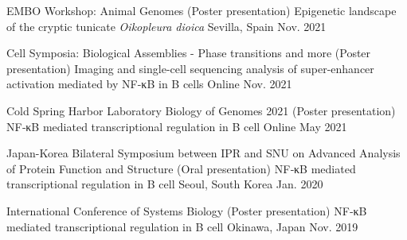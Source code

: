 



\begin{cventries}

  \cventrypub
    {EMBO Workshop: Animal Genomes (Poster presentation)} %
    {Epigenetic landscape of the cryptic tunicate \textit{Oikopleura dioica}} %
    {Sevilla, Spain} %
    {Nov. 2021} %

  \cventrypub
    {Cell Symposia: Biological Assemblies - Phase transitions and more (Poster presentation)} %
    {Imaging and single-cell sequencing analysis of super-enhancer activation mediated by NF-κB in B cells} %
    {Online} %
    {Nov. 2021} %

  \cventrypub
    {Cold Spring Harbor Laboratory Biology of Genomes 2021 (Poster presentation)} %
    {NF‑κB mediated transcriptional regulation in B cell} %
    {Online} %
    {May 2021} %

  \cventrypub
    {Japan-Korea Bilateral Symposium between IPR and SNU on Advanced Analysis of Protein Function and Structure (Oral presentation)} %
    {NF‑κB mediated transcriptional regulation in B cell} %
    {Seoul, South Korea} %
    {Jan. 2020} %

  \cventrypublast
    {International Conference of Systems Biology (Poster presentation)} %
    {NF‑κB mediated transcriptional regulation in B cell} %
    {Okinawa, Japan} %
    {Nov. 2019} %
  

\end{cventries}



